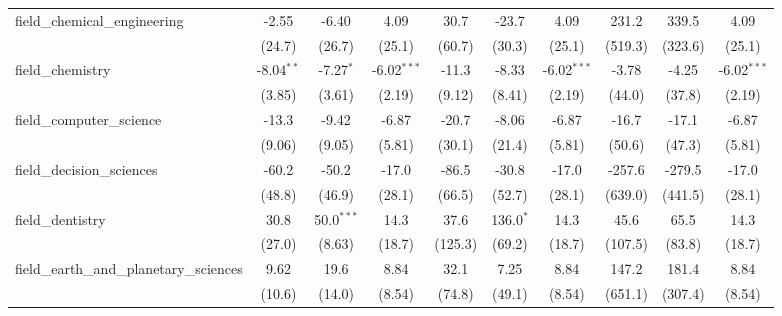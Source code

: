 \begin{tabular}{lccccccccc}
   field\_chemical\_engineering                                & -2.55         & -6.40         & 4.09          & 30.7           & -23.7         & 4.09          & 231.2   & 339.5     & 4.09\\   
                                                               & (24.7)        & (26.7)        & (25.1)        & (60.7)         & (30.3)        & (25.1)        & (519.3) & (323.6)   & (25.1)\\   
   field\_chemistry                                            & -8.04$^{**}$  & -7.27$^{*}$   & -6.02$^{***}$ & -11.3          & -8.33         & -6.02$^{***}$ & -3.78   & -4.25     & -6.02$^{***}$\\   
                                                               & (3.85)        & (3.61)        & (2.19)        & (9.12)         & (8.41)        & (2.19)        & (44.0)  & (37.8)    & (2.19)\\   
   field\_computer\_science                                    & -13.3         & -9.42         & -6.87         & -20.7          & -8.06         & -6.87         & -16.7   & -17.1     & -6.87\\   
                                                               & (9.06)        & (9.05)        & (5.81)        & (30.1)         & (21.4)        & (5.81)        & (50.6)  & (47.3)    & (5.81)\\   
   field\_decision\_sciences                                   & -60.2         & -50.2         & -17.0         & -86.5          & -30.8         & -17.0         & -257.6  & -279.5    & -17.0\\   
                                                               & (48.8)        & (46.9)        & (28.1)        & (66.5)         & (52.7)        & (28.1)        & (639.0) & (441.5)   & (28.1)\\   
   field\_dentistry                                            & 30.8          & 50.0$^{***}$  & 14.3          & 37.6           & 136.0$^{*}$   & 14.3          & 45.6    & 65.5      & 14.3\\   
                                                               & (27.0)        & (8.63)        & (18.7)        & (125.3)        & (69.2)        & (18.7)        & (107.5) & (83.8)    & (18.7)\\   
   field\_earth\_and\_planetary\_sciences                      & 9.62          & 19.6          & 8.84          & 32.1           & 7.25          & 8.84          & 147.2   & 181.4     & 8.84\\   
                                                               & (10.6)        & (14.0)        & (8.54)        & (74.8)         & (49.1)        & (8.54)        & (651.1) & (307.4)   & (8.54)\\   

\end{tabular}
